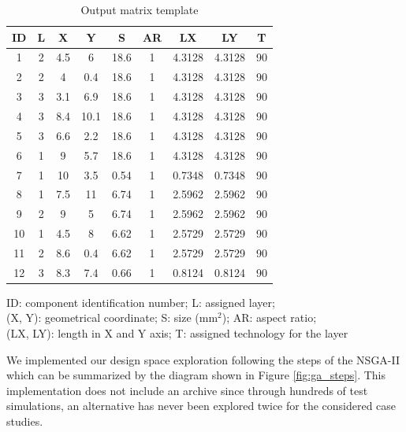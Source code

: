 \begin{table}[h!]
\caption{Output matrix template}
\begin{center}
\begin{scriptsize}
\begin{tabular}{|c|c|c|c|c|c|c|c|c|}
\hline ID & L & X & Y & S & AR & LX & LY & T\\
\hline 1 & 2 & 4.5 & 6 & 18.6 & 1 & 4.3128 & 4.3128 & 90\\
2 & 2 & 4 & 0.4 & 18.6 & 1 & 4.3128 & 4.3128 & 90\\
3 & 3 & 3.1 & 6.9 & 18.6 & 1 & 4.3128 & 4.3128 & 90\\
4 & 3 & 8.4 & 10.1 & 18.6 & 1 & 4.3128 & 4.3128 & 90\\
5 & 3 & 6.6 & 2.2 & 18.6 & 1 & 4.3128 & 4.3128 & 90\\
6 & 1 & 9 & 5.7 & 18.6 & 1 & 4.3128 & 4.3128 & 90\\
7 & 1 & 10 & 3.5 & 0.54 & 1 & 0.7348 & 0.7348 & 90\\
8 & 1 & 7.5 & 11 & 6.74 & 1 & 2.5962 & 2.5962 & 90\\
9 & 2 & 9 & 5 & 6.74 & 1 & 2.5962 & 2.5962 & 90\\
10 & 1 & 4.5 & 8 & 6.62 & 1 & 2.5729 & 2.5729 & 90\\
11 & 2 & 8.6 & 0.4 & 6.62 & 1 & 2.5729 & 2.5729 & 90\\
12 & 3 & 8.3 & 7.4 & 0.66 & 1 & 0.8124 & 0.8124 & 90\\
\hline
\end{tabular}
\end{scriptsize}
\end{center}
\begin{center}
\begin{scriptsize}
ID: component identification number; L: assigned layer;\\
(X, Y): geometrical coordinate; S: size (mm$^2$); AR: aspect ratio;\\
(LX, LY): length in X and Y axis; T: assigned technology for the layer
\end{scriptsize}
\end{center}
\label{tab:outputmat}
\end{table}

We implemented our design space exploration following the steps of the NSGA-II which can be summarized by the diagram shown in Figure \ref{fig:ga_steps}. This implementation does not include an archive since through hundreds of test simulations, an alternative has never been explored twice for the considered case studies.

